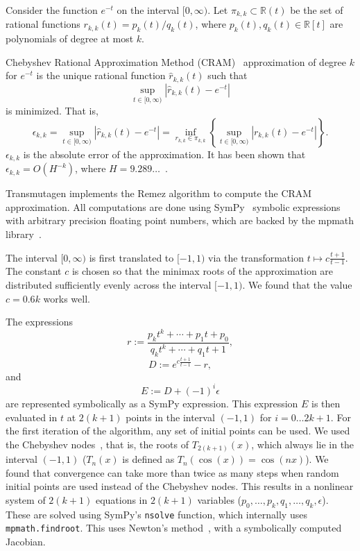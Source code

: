 Consider the function $e^{-t}$ on the interval $[0,\infty)$. Let
$\pi_{k,k}\subset \mathbb{R}(t)$ be the set of rational functions $r_{k,k}(t)
= p_k(t)/q_k(t)$, where $p_k(t), q_k(t)\in \mathbb{R}[t]$ are polynomials of
degree at most $k$.

Chebyshev Rational Approximation Method (CRAM)~\cite{ationneeded} approximation of degree $k$
for $e^{-t}$ is the unique rational function $\hat{r}_{k,k}(t)$ such that
\begin{equation}
  \sup_{t\in[0, \infty)}|\hat{r}_{k, k}(t) - e^{-t}|
\end{equation}
is minimized. That is,
\begin{equation}
  \epsilon_{k,k} = \sup_{t\in[0, \infty)}|\hat{r}_{k, k}(t) - e^{-t}| = \inf_{r_{k,k}\in\pi_{k,k}}\left\{\sup_{t\in[0, \infty)}|r_{k, k}(t) - e^{-t}|\right\}.
\end{equation}
$\epsilon_{k,k}$ is the absolute error of the approximation. It has been shown
that $\epsilon_{k,k} = O(H^{-k})$, where $H=9.289\ldots$~\cite{ationneeded}.

Transmutagen implements the Remez algorithm to compute the CRAM approximation.
All computations are done using SymPy~\cite{10.7717/peerj-cs.103} symbolic expressions with arbitrary
precision floating point numbers, which are backed by the mpmath library~\cite{ationneeded}.

The interval $[0, \infty)$ is first translated to $[-1, 1)$ via the
transformation $t\mapsto c\frac{t+1}{t-1}$.
The constant $c$ is chosen so that the minimax roots of the approximation are
distributed sufficiently evenly across the interval $[-1, 1)$. We found that
the value $c=0.6k$ works well.

The expressions
\begin{equation}
  r := \frac{p_kt^k + \cdots + p_1t + p_0}{q_kt^k + \cdots +
    q_1t + 1},
\end{equation}
\begin{equation}
  D := e^{c\frac{t+1}{t-1}} - r,
\end{equation}
and
\begin{equation}
  E := D + (-1)^i\epsilon
\end{equation}
are represented symbolically as a SymPy expression. This expression $E$ is
then evaluated in $t$ at $2(k + 1)$ points in the interval $(-1, 1)$ for
$i=0\ldots 2k+1$. For the first iteration of the algorithm, any set of initial
points can be used. We used the Chebyshev nodes~\cite{ationneeded}, that is,
the roots of $T_{2(k +1)}(x)$, which always lie in the interval $(-1, 1)$
($T_n(x)$ is defined as $T_n(\cos(x)) = \cos(nx)$). We found that convergence
can take more than twice as many steps when random initial points are used
instead of the Chebyshev nodes. 
This results in a nonlinear system of $2(k+1)$ equations in $2(k+1)$ variables
($p_0,\ldots,p_k,q_1,\ldots,q_k,\epsilon$). These are solved using SymPy's
\texttt{nsolve} function, which internally uses \texttt{mpmath.findroot}. This
uses Newton's method~\cite{ationneeded}, with a symbolically computed
Jacobian.

